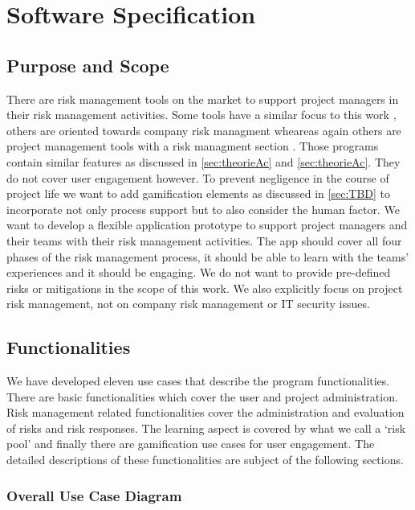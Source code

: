 \newpage
\section{Software Specification}
\label{sec:domainB}

\subsection{Purpose and Scope}
\label{sec:domainBa}
There are risk management tools on the market to support project managers in their risk management activities. Some tools have a similar focus to this work \cite{OperationalRiskManagement}, \cite{RiskManagementSoftware} others are oriented towards company risk managment \cite{QHSERiskCompliance} wheareas again others are project management tools with a risk managment section \cite{https://www.ntaskmanager.com/}. Those programs contain similar features as discussed in \ref{sec:theorieAc} and \ref{sec:theorieAc}. They do not cover user engagement however. To prevent negligence in the course of project life we want to add gamification elements as discussed in \ref{sec:TBD} to incorporate not only process support but to also consider the human factor.
We want to develop a flexible application prototype to support project managers and their teams with their risk management activities. The app should cover all four phases of the risk management process, it should be able to learn with the teams’ experiences and it should be engaging.
We do not want to provide pre-defined risks or mitigations in the scope of this work. We also explicitly focus on project risk management, not on company risk management or IT security issues. 

\subsection{Functionalities}
\label{sec:domainBb}
We have developed eleven use cases that describe the program functionalities. There are basic functionalities which cover the user and project administration. Risk management related functionalities cover the administration and evaluation of risks and risk responses. The learning aspect is covered by what we call a ‘risk pool’ and finally there are gamification use cases for user engagement. The detailed descriptions of these functionalities are subject of the following sections. 

\subsubsection{Overall Use Case Diagram}
\label{sec:domainBba}

